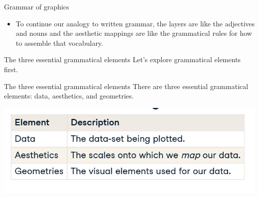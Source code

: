 \documentclass[
  ignorenonframetext,
]{beamer}
\providecommand{\tightlist}{%
  \setlength{\itemsep}{0pt}\setlength{\parskip}{0pt}}
\begin{document}
\begin{frame}{Grammar of graphics}
\label{grammar-of-graphics-3}
\begin{itemize}
\tightlist
\item
  To continue our analogy to written grammar, the layers are like the
  adjectives and nouns and the aesthetic mappings are like the
  grammatical rules for how to assemble that vocabulary.
\end{itemize}
\end{frame}

\begin{frame}{The three essential grammatical elements}
\label{the-three-essential-grammatical-elements}
Let's explore grammatical elements first.
\end{frame}

\begin{frame}{The three essential grammatical elements}
\label{the-three-essential-grammatical-elements-1}
There are three essential grammatical elements: data, aesthetics, and
geometries.

\includegraphics{../images/im122.png}
\end{frame}
\end{document}
